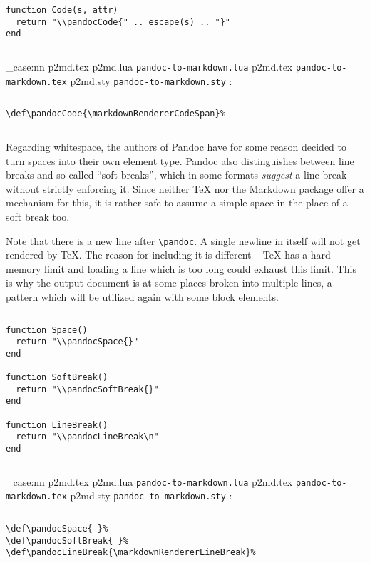 \documentclass[
  digital,     %
  oneside,     %
  nosansbold,  %
  nocolorbold, %
  lof,         %
  lot,         %
]{fithesis4}
\newcommand\macro[1]{\texttt{\textbackslash{}{#1}}}
\newcommand\pandoc[1]{\macro{pandoc\-{#1}}}
\newcommand\file[1]
  {
    \str_case:nn
      { #1 }
      {
        { p2md.lua } { \texttt{pandoc\hyp{}to\hyp{}markdown.lua} }
        { p2md.tex } { \texttt{pandoc\hyp{}to\hyp{}markdown.tex} }
        { p2md.sty } { \texttt{pandoc\hyp{}to\hyp{}markdown.sty} }
      }
  }
\begin{document}
$ $

\noindent
\lstset{language=[5.3]Lua}
\begin{lstlisting}
function Code(s, attr)
  return "\\pandocCode{" .. escape(s) .. "}"
end
\end{lstlisting}

$ $

\noindent
\file{p2md.tex}:

$ $

\noindent
\lstset{language=[plain]TeX}
\begin{lstlisting}
\def\pandocCode{\markdownRendererCodeSpan}%
\end{lstlisting}

$ $

\noindent
Regarding whitespace, the authors of Pandoc have for some reason decided to turn spaces into their own element type. Pandoc also distinguishes between line breaks and so-called ``soft breaks'', which in some formats \textit{suggest} a line break without strictly enforcing it. Since neither \TeX{} nor the Markdown package offer a mechanism for this, it is rather safe to assume a simple space in the place of a soft break too.

Note that there is a new line after \pandoc{LineBreak}. A single newline in itself will not get rendered by \TeX{}. The reason for including it is different -- \TeX{} has a hard memory limit and loading a line which is too long could exhaust this limit. This is why the output document is at some places broken into multiple lines, a pattern which will be utilized again with some block elements.

$ $

\noindent
\lstset{language=[5.3]Lua}
\begin{lstlisting}
function Space()
  return "\\pandocSpace{}"
end

function SoftBreak()
  return "\\pandocSoftBreak{}"
end

function LineBreak()
  return "\\pandocLineBreak\n"
end
\end{lstlisting}

$ $

\noindent
\file{p2md.tex}:

$ $

\noindent
\lstset{language=[plain]TeX}
\begin{lstlisting}
\def\pandocSpace{ }%
\def\pandocSoftBreak{ }%
\def\pandocLineBreak{\markdownRendererLineBreak}%
\end{lstlisting}
\end{document}
